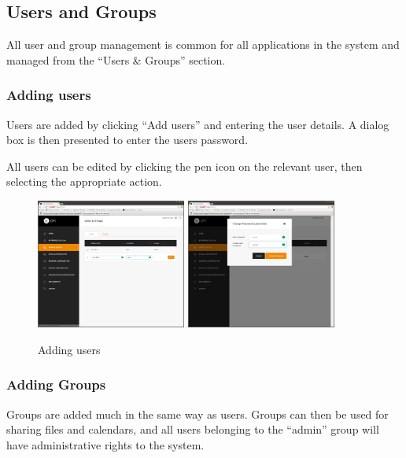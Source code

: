 \documentclass[12pt,a4paper,titlepage]{article}
\begin{document}
\subsection{Users and Groups}
All user and group management is common for all applications in the system and managed from the ``Users \& Groups'' section.
\subsubsection{Adding users}
Users are added by clicking ``Add users'' and entering the user details. A dialog box is then presented to enter the users password.

All users can be edited by clicking the pen icon on the relevant user, then selecting the appropriate action.
\begin{figure}[h!]
\centering
\includegraphics[width=4.93cm]{./img/users-1}
\includegraphics[width=4.93cm]{./img/users-2}
\caption{Adding users}
\end{figure}

\subsubsection{Adding Groups}
Groups are added much in the same way as users. Groups can then be used for sharing files and calendars, and all users belonging to the ``admin'' group will have administrative rights to the system.
\end{document}
